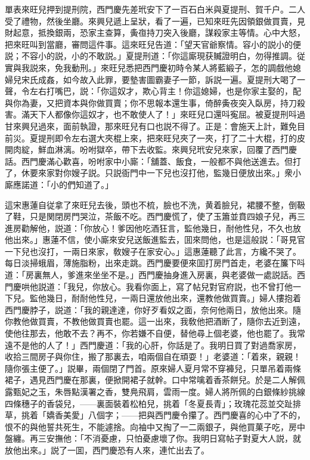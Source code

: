 單表來旺兒押到提刑院，西門慶先差玳安下了一百石白米與夏提刑、賀千户。二人受了禮物，然後坐廳。來興兒遞上呈狀，看了一遍，已知來旺先因領銀做買賣，見財起意，抵換銀兩，恐家主查算，夤亱持刀突入後廳，謀殺家主等情。心中大怒，把來旺叫到當廳，審問這件事。這來旺兒告道：「望天官爺察情。容小的説小的便説；不容小的説，小的不敢説。」夏提刑道：「你這廝現获贓證明白，勿得推調。従實與我説來，免我動刑。」來旺兒悉把西門慶初時令某人將藍緞子，怎的調戲他媳婦兒宋氏成姦，如今故入此罪，要墊害圖霸妻子一節，訴説一遍。夏提刑大喝了一聲，令左右打嘴巴，説：「你這奴才，欺心背主！你這媳婦，也是你家主娶的，配與你為妻，又把資本與你做買賣；你不思報本還生事，倚醉夤夜突入臥房，持刀殺害。滿天下人都像你這奴才，也不敢使人了！」來旺兒口還呌寃屈。被夏提刑呌過甘來興兒過來，面前執證，那來旺兒有口也説不得了。正是：會施天上計，難免目前災。夏提刑即令左右選大夾棍上來，把來旺兒夾了一夾，打了二十大棍，打的皮開肉綻，鮮血淋漓。吩咐獄卒，帶下去收監。來興兒玳安兒來家，回覆了西門慶話。西門慶滿心歡喜，吩咐家中小廝：「舖蓋、飯食，一般都不與他送進去。但打了，休要來家對你嫂子説。只説衙門中一下兒也沒打他，監幾日便放出來。」衆小廝應諾道：「小的們知道了。」

這宋惠蓮自従拿了來旺兒去後，頭也不梳，臉也不洗，黄着臉兒，裙腰不整，倒靸了鞋，只是関閉房門哭泣，茶飯不吃。西門慶慌了，使了玉簫並賁四娘子兒，再三進房勸解他，説道：「你放心！爹因他吃酒狂言，監他幾日，耐他性兒，不久也放他出來。」惠蓮不信，使小廝來安兒送飯進監去，囬來問他，也是這般説：「哥見官一下兒也沒打，一兩日來家，敎嫂子在家安心。」這惠蓮聽了此言，方纔不哭了。每日淡掃蛾眉，薄施脂粉，出來走跳。西門慶要便來囬打房門首走，老婆在簾下呌道：「房裏無人，爹進來坐坐不是。」西門慶抽身進入房裏，與老婆做一處説話。西門慶哄他説道：「我兒，你放心。我看你面上，寫了帖兒對官府説，也不曾打他一下兒。監他幾日，耐耐他性兒，一兩日還放他出來，還教他做買賣。」婦人摟抱着西門慶脖子，説道：「我的親達達，你好歹看奴之面，奈何他兩日，放他出來。隨你教他做買賣，不教他做買賣也罷。這一出來，我敎他把酒断了，隨你去近到遠，使他往那去，他敢不去？再不，你若嫌不自便，替他尋上個老婆，他也罷了。我常遠不是他的人了！」西門慶道：「我的心肝，你話是了。我明日買了對過喬家房，收拾三間房子與你住，搬了那裏去，咱兩個自在頑耍！」老婆道：「着來，親親！隨你張主便了。」説畢，兩個閉了門首。原來婦人夏月常不穿褲兒，只單吊着兩條裙子，遇見西門慶在那裏，便掀開裙子就幹。口中常噙着香茶餅兒。於是二人解佩露甄妃之玉，朱唇點漢署之香，雙鳧飛肩，雲雨一度。婦人將所佩的白銀條紗挑線四條穗子的香袋兒，——裏面裝着松柏兒，挑着「冬夏長青」；玫瑰花蕊並交趾排草，挑着「嬌香美愛」八個字；——把與西門慶令攥了。西門慶喜的心中了不的，恨不的與他誓共死生，不能遽捨。向袖中又掏了一二兩銀子，與他買菓子吃，房中盤纏。再三安撫他：「不消憂慮，只怕憂慮壞了你。我明日寫帖子對夏大人説，就放他出來。」説了一囬，西門慶恐有人來，連忙出去了。

